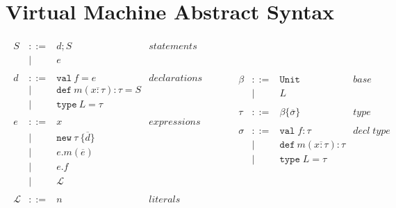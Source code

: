 \documentclass{article}
\newcommand{\keywadj}[1]{\mathtt{#1}}
\newcommand{\keyw}[1]{\keywadj{#1}~}
\begin{document}
\section{Virtual Machine Abstract Syntax}

\[
\begin{array}{lll}
\begin{array}{lllr}
S & ::= & d; S& statements \\
  & |   & e & \\
&&\\
d & ::= & \keyw{val} f = e & declarations \\
  & |   & \keyw{def} m(\overline{x:\tau}) : \tau = S &\\
  & |   & \keyw{type} L = \tau &\\
&&\\
e & ::= & x & expressions \\
& | & \keywadj{new}~\tau~\{\overline{d}\}&\\
& | & e.m(\overline{e}) &\\
& | & e.f &\\
& | & \mathscr{L} &\\
&&\\
\mathscr{L} & ::= & n & literals \\
\end{array}
& ~~~~~~
&
\begin{array}{lllr}
\beta & ::= & \keyw{Unit} & \textit{base type} \\
      & |   & L \\
&&\\
\tau & ::= & \beta \{\overline{\sigma}\} & type \\
&&\\
\sigma & ::= & \texttt{val} \; f:\tau & decl \; type\\
       & |   & \keyw{def} m(\overline{x:\tau}) : \tau &\\
       & |   & \texttt{type} \; L = \tau &\\
&&\\
\end{array}
\end{array}
\]
\end{document}
